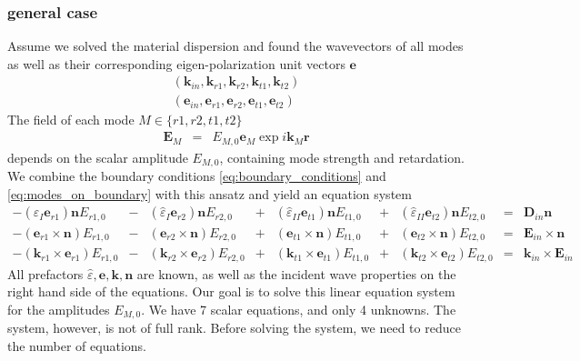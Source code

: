 \documentclass[12pt,a4paper,twoside,openright,BCOR10mm,headsepline,titlepage,abstracton,chapterprefix,final]{scrreprt}
\newcommand\Vector[1]{{\mathbf{#1}}}
\newcommand\Location{\Vector{r}}
\newcommand\wavenumber{k}
\newcommand\Wavevector{\Vector{\wavenumber}}
\newcommand\Tensor[1]{\hat{#1}}
\newcommand\scalarEfield{E}
\newcommand\scalarDfield{D}
\newcommand\Efield{\Vector{\scalarEfield}}
\newcommand\Dfield{\Vector{\scalarDfield}}
\newcommand\permittivity{\Tensor{\scalarpermittivity}}
\newcommand\scalarpermittivity{\varepsilon}
\newcommand\materialone{I}
\newcommand\materialtwo{{II}}
\begin{document}
\subsubsection{general case}
Assume we solved the material dispersion and found the wavevectors of all modes as well as their corresponding eigen-polarization unit vectors $\Vector{e}$
\begin{subequations}
\begin{eqnarray}
(\Wavevector_{in}, \Wavevector_{r1}, \Wavevector_{r2}, \Wavevector_{t1}, \Wavevector_{t2}) \\
(\Vector{e}_{in}, \Vector{e}_{r1}, \Vector{e}_{r2}, \Vector{e}_{t1}, \Vector{e}_{t2})
\end{eqnarray}
\end{subequations}
The field of each mode $M \in \{ r1, r2, t1, t2 \}$
\begin{eqnarray}
\Efield_{M} &=& E_{M,0} \Vector{e}_{M} \exp{i \Wavevector_M \Location}
\end{eqnarray}
depends on the scalar amplitude $E_{M,0}$, containing mode strength and retardation.
We combine the boundary conditions \ref{eq:boundary_conditions} and \ref{eq:modes_on_boundary} with this ansatz and yield an equation system
\begingroup \small
\begin{subequations}
\begin{align}
   - ( \permittivity_\materialone \Vector{e}_{r1}) \Vector{n} E_{r1,0} &-& ( \permittivity_\materialone \Vector{e}_{r2}) \Vector{n} E_{r2,0} &+& ( \permittivity_\materialtwo \Vector{e}_{t1} ) \Vector{n} E_{t1,0} &+& ( \permittivity_\materialtwo \Vector{e}_{t2} ) \Vector{n} E_{t2,0} &=& \Dfield_{in} \Vector{n} \label{eq:fresneldn}\\
   - ( \Vector{e}_{r1} \times \Vector{n} )         E_{r1,0} &-& ( \Vector{e}_{r2} \times \Vector{n} )         E_{r2,0} &+& ( \Vector{e}_{t1} \times \Vector{n} )          E_{t1,0} &+& ( \Vector{e}_{t2} \times \Vector{n} )          E_{t2,0} &=& \Efield_{in} \times \Vector{n} \label{eq:fresnelEcrossn} \\
   - ( \Wavevector_{r1} \times \Vector{e}_{r1} )   E_{r1,0} &-& ( \Wavevector_{r2} \times \Vector{e}_{r2} )   E_{r2,0} &+& ( \Wavevector_{t1} \times \Vector{e}_{t1} )    E_{t1,0} &+& ( \Wavevector_{t2} \times \Vector{e}_{t2} )    E_{t2,0} &=& \Wavevector_{in} \times \Efield_{in} \label{eq:fresnelkE}
\end{align}
\end{subequations}
\endgroup
All prefactors $\permittivity, \Vector{e}, \Wavevector, \Vector{n}$ are known, 
as well as the incident wave properties on the right hand side of the equations.
Our goal is to solve this linear equation system for the amplitudes $E_{M,0}$.
We have 7 scalar equations, and only 4 unknowns.
The system, however, is not of full rank.
Before solving the system, we need to reduce the number of equations.
\end{document}
